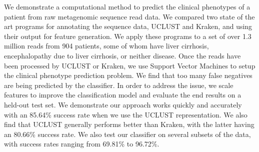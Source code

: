 
We demonstrate a computational method to predict the clinical
phenotypes of a patient from raw metagenomic sequence read data. We  compared 
two state of the art programs for annotating the sequence data, 
UCLUST and Kraken, and using their output for feature generation. 
We apply these programs 
to a set of over 1.3 million reads from 
904 patients, some of whom have liver cirrhosis, encephalopathy due to liver cirrhosis, or 
neither disease. Once the reads have been processed by UCLUST or 
Kraken, we use  Support Vector Machines to setup the 
clinical phenotype prediction problem.  
%
We find that too many false negatives are being predicted by 
the classifier. In order to address the issue, we scale features to
improve the classification model and evaluate the 
end results on a held-out test set. We
demonstrate our approach works quickly and 
accurately with an 85.64\% success rate when we use the 
UCLUST representation. We also find that UCLUST generally performs better than Kraken, with the latter having an 80.66\% success rate. We also test our classifier on several subsets of the data, with success rates ranging from 69.81\% to 96.72\%.
